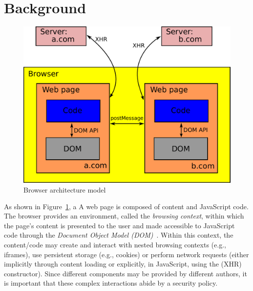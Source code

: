 \section{Background}
\label{sec:background}

%
\iffigures
\begin{figure}
\begin{center}
\includegraphics[scale=0.35]{setting.pdf}
\end{center}
\vspace{-10pt}
\caption{\label{fig:browser-arch} Browser architecture model}
\vspace{-10pt}
\end{figure}
As shown in Figure~\ref{fig:browser-arch}, a 
\else
A
\fi
web page is composed of
content and JavaScript code.
%
The browser provides an environment, called the \emph{browsing
context}, within which the page's content is presented to the user and
made accessible to JavaScript code through the \emph{Document Object
Model (DOM)}~\cite{html5}.
%
Within this context, the content/code may create and interact with
nested browsing contexts (e.g., iframes), use persistent storage
(e.g., cookies) or perform network requests (either implicitly through
content loading or explicitly, in JavaScript, using the \xhr{} (XHR)
constructor).
%
Since different components may be provided by different authors, it is
important that these complex interactions abide by a security policy.
 
